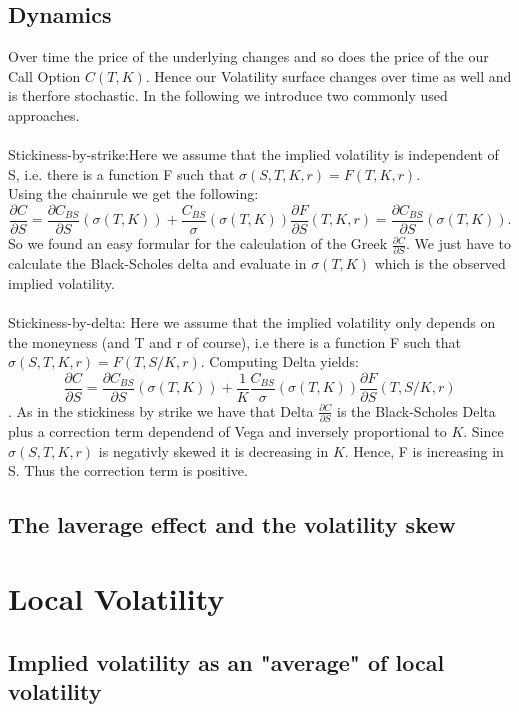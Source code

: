 \documentclass[12pt]{article}
\theoremstyle{definition}
\newcommand{\C}{C_{BS}}
\begin{document}
\subsection{Dynamics}
Over time the price of the underlying changes and so does the price of the our Call Option $C(T,K)$. Hence our Volatility surface changes over time as well and is therfore stochastic. In the following we introduce two commonly used approaches.\\\\
Stickiness-by-strike:Here we assume that the implied volatility is independent of S, i.e. there is a function F such that $\sigma(S,T,K,r)=F(T,K,r)$.\\
Using the chainrule we get the following:
$$\frac{\partial C}{\partial S}=\frac{\partial\C}{\partial S}(\sigma(T,K))+\frac{\C}{\sigma}(\sigma(T,K))\frac{\partial F}{\partial S}(T,K,r)=\frac{\partial\C}{\partial S}(\sigma(T,K)).$$
So we found an easy formular for the calculation of the Greek $\frac{\partial C}{\partial S}$. We just have to calculate the Black-Scholes delta and evaluate in $\sigma(T,K)$ which is the observed implied volatility. \\\\
Stickiness-by-delta: Here we assume that the implied volatility only depends on the moneyness (and T and r of course), i.e there is a function F such that $\sigma(S,T,K,r)=F(T,S/K,r)$. Computing Delta yields:
$$\frac{\partial C}{\partial S}=\frac{\partial\C}{\partial S}(\sigma(T,K))+\frac{1}{K}\frac{\C}{\sigma}(\sigma(T,K))\frac{\partial F}{\partial S}(T,S/K,r) $$.
As in the stickiness by strike we have that Delta $\frac{\partial C}{\partial S}$ is the Black-Scholes Delta plus a correction term dependend of Vega and inversely proportional to $K$. Since $\sigma(S,T,K,r)$ is negativly skewed it is decreasing in $K$. Hence, F is increasing in S. Thus the correction term is positive.\\

\subsection{The laverage effect and the volatility skew}

\section{Local Volatility}

\subsection{Implied volatility as an "average" of local volatility}
\end{document}
